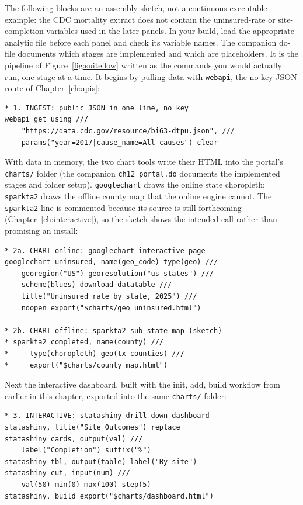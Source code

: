 \documentclass[
    a4paper,
    fontsize=10pt,
    twoside=true,
    numbers=noenddot,
]{kaobook}
\begin{document}
The following blocks are an assembly sketch, not a continuous executable example: the CDC mortality extract does not contain the uninsured-rate or site-completion variables used in the later panels. In your build, load the appropriate analytic file before each panel and check its variable names. The companion do-file documents which stages are implemented and which are placeholders. It is the pipeline of Figure~\ref{fig:suiteflow} written as the commands you would actually run, one stage at a time. It begins by pulling data with \texttt{webapi}, the no-key JSON route of Chapter~\ref{ch:apis}:
\par
{\footnotesize
\begin{verbatim}
* 1. INGEST: public JSON in one line, no key
webapi get using ///
    "https://data.cdc.gov/resource/bi63-dtpu.json", ///
    params("year=2017|cause_name=All causes") clear
\end{verbatim}
}
With data in memory, the two chart tools write their HTML into the portal's \texttt{charts/} folder (the companion \texttt{ch12\_portal.do} documents the implemented stages and folder setup). \texttt{googlechart} draws the online state choropleth; \texttt{sparkta2} draws the offline county map that the online engine cannot. The \texttt{sparkta2} line is commented because its source is still forthcoming (Chapter~\ref{ch:interactive}), so the sketch shows the intended call rather than promising an install:
\par
{\footnotesize
\begin{verbatim}
* 2a. CHART online: googlechart interactive page
googlechart uninsured, name(geo_code) type(geo) ///
    georegion("US") georesolution("us-states") ///
    scheme(blues) download datatable ///
    title("Uninsured rate by state, 2025") ///
    noopen export("$charts/geo_uninsured.html")

* 2b. CHART offline: sparkta2 sub-state map (sketch)
* sparkta2 completed, name(county) ///
*     type(choropleth) geo(tx-counties) ///
*     export("$charts/county_map.html")
\end{verbatim}
}
Next the interactive dashboard, built with the init, add, build workflow from earlier in this chapter, exported into the same \texttt{charts/} folder:
\par
{\footnotesize
\begin{verbatim}
* 3. INTERACTIVE: statashiny drill-down dashboard
statashiny, title("Site Outcomes") replace
statashiny cards, output(val) ///
    label("Completion") suffix("%")
statashiny tbl, output(table) label("By site")
statashiny cut, input(num) ///
    val(50) min(0) max(100) step(5)
statashiny, build export("$charts/dashboard.html")
\end{verbatim}
}
\end{document}
